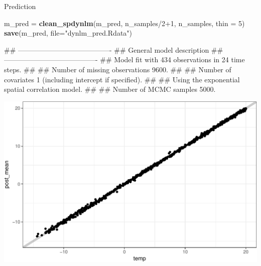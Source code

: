 \documentclass[11pt,ignorenonframetext,]{beamer}
\newenvironment{Shaded}{}{}
\newcommand{\DataTypeTok}[1]{\textcolor[rgb]{0.56,0.13,0.00}{#1}}
\newcommand{\DecValTok}[1]{\textcolor[rgb]{0.25,0.63,0.44}{#1}}
\newcommand{\KeywordTok}[1]{\textcolor[rgb]{0.00,0.44,0.13}{\textbf{#1}}}
\newcommand{\NormalTok}[1]{#1}
\newcommand{\OperatorTok}[1]{\textcolor[rgb]{0.40,0.40,0.40}{#1}}
\newcommand{\StringTok}[1]{\textcolor[rgb]{0.25,0.44,0.63}{#1}}
\let\oldShaded\Shaded
\let\endoldShaded\endShaded
\renewenvironment{Shaded}{\footnotesize\begin{spacing}{0.9}\oldShaded}{\endoldShaded\end{spacing}}
\begin{document}
\begin{frame}[fragile]{Prediction}
\begin{Shaded}
\begin{Highlighting}[]
\NormalTok{m_pred =}\StringTok{ }\KeywordTok{clean_spdynlm}\NormalTok{(m_pred, n_samples}\OperatorTok{/}\DecValTok{2}\OperatorTok{+}\DecValTok{1}\NormalTok{, n_samples, }\DataTypeTok{thin =} \DecValTok{5}\NormalTok{)}
\KeywordTok{save}\NormalTok{(m_pred, }\DataTypeTok{file=}\StringTok{"dynlm_pred.Rdata"}\NormalTok{)}

\NormalTok{## ----------------------------------------}
\NormalTok{##  General model description}
\NormalTok{## ----------------------------------------}
\NormalTok{## Model fit with 434 observations in 24 time steps.}
\NormalTok{## }
\NormalTok{## Number of missing observations 9600.}
\NormalTok{## }
\NormalTok{## Number of covariates 1 (including intercept if specified).}
\NormalTok{## }
\NormalTok{## Using the exponential spatial correlation model.}
\NormalTok{## }
\NormalTok{## Number of MCMC samples 5000.}
\end{Highlighting}
\end{Shaded}

\end{frame}

\begin{frame}{}
\protect\hypertarget{section-2}{}

\begin{center}\includegraphics[width=\textwidth]{Lec22_files/figure-beamer/unnamed-chunk-16-1} \end{center}

\end{frame}
\end{document}
